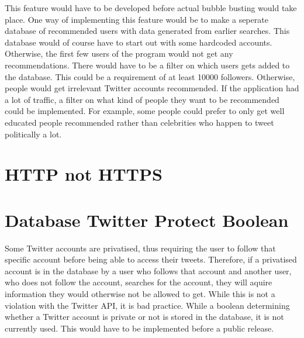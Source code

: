 This feature would have to be developed before actual bubble busting would take
place. One way of implementing this feature would be to make a seperate
database of recommended users with data generated from earlier searches. This
database would of course have to start out with some hardcoded accounts.
Otherwise, the first few users of the program would not get any
recommendations. There would have to be a filter on which users gets added to
the database. This could be a requirement of at least 10000 followers.
Otherwise, people would get irrelevant Twitter accounts recommended. If the
application had a lot of traffic, a filter on what kind of people they want to
be recommended could be implemented. For example, some people could prefer to
only get well educated people recommended rather than celebrities who happen to
tweet politically a lot.


\section*{HTTP not HTTPS}

\section{Database Twitter Protect Boolean}\label{sec:twitterProtect}
Some Twitter accounts are privatised, thus requiring the user to follow that
specific account before being able to access their tweets. Therefore, if a
privatised account is in the database by a user who follows that account and
another user, who does not follow the account, searches for the account, they
will aquire information they would otherwise not be allowed to get. While this
is not a violation with the Twitter API, it is bad practice. While a boolean
determining whether a Twitter account is private or not is stored in the
database, it is not currently used. This would have to be implemented before a
public release.

% 
% 
